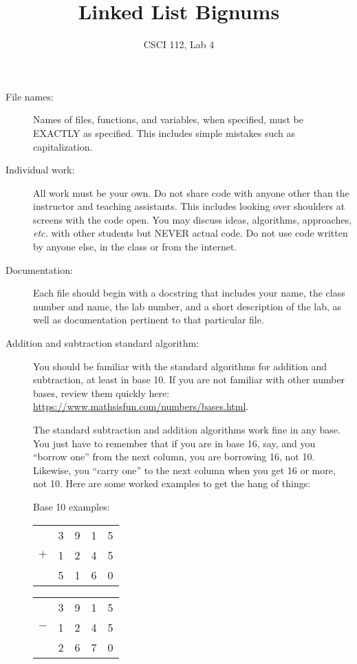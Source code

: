 \documentclass{article}
\title{Linked List Bignums}
\author{CSCI 112, Lab 4}
\date{}
\begin{document}
\sloppy

\maketitle

\begin{description} 
\item[File names:]  Names of files, functions, and variables, 
when specified,
must be EXACTLY as specified.  This includes simple mistakes such
as capitalization.

\item[Individual work:]  All work must be your own.  Do not share
code with anyone other than the instructor and teaching assistants.
This includes looking over shoulders at screens with the code open.
You may discuss ideas, algorithms, approaches, {\em etc.} with
other students but NEVER actual code.  Do not use code
written by anyone else, in the class or from the internet.

\item[Documentation:] Each file should begin with a docstring
that includes your name, the class number and name, the lab
number, and  
a short description of the lab, as well as documentation pertinent
to that particular file.

\item[Addition and subtraction standard algorithm:]  You should be
familiar with the standard algorithms for addition and subtraction,
at least in base 10.  If you are not familiar with other number bases,
review them quickly here: \url{https://www.mathsisfun.com/numbers/bases.html}.

The standard subtraction and addition algorithms work fine in any
base.  You just have to remember that if you are in base 16, say,
and you ``borrow one'' from the next column, you are borrowing 16,
not 10.  Likewise, you ``carry one'' to the next column when you
get 16 or more, not 10.  Here are some worked examples to get
the hang of things:

Base 10 examples:\hfill
\begin{tabular}{rrrrr}
  &3 &9 &1 &5\\
$+$ &1 &2 &4 &5\\
\hline
  &5 &1 &6 &0\\
\end{tabular}\hfill
\begin{tabular}{rrrrr}
  &3 &9 &1 &5\\
$-$ &1 &2 &4 &5\\
\hline
  &2 &6 &7 &0\\
\end{tabular}


\end{description}
\end{document}
